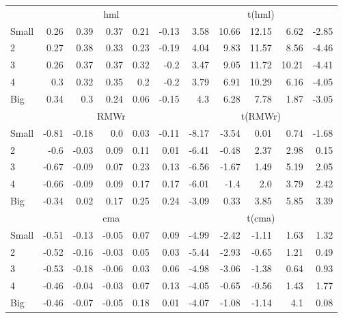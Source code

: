 \begin{table}[!ht]
\begin{tabular}{lrrrrrrrrrr}
  

      & \multicolumn{5}{c}{hml} & \multicolumn{5}{c}{t(hml)} \\
    \cmidrule(r){2-6} \cmidrule(r){7-11}
      Small  & 0.26  & 0.39  & 0.37  & 0.21  & -0.13   & 3.58  & 10.66  & 12.15  & 6.62  & -2.85  \\
          2  & 0.27  & 0.38  & 0.33  & 0.23  & -0.19   & 4.04  & 9.83  & 11.57  & 8.56  & -4.46  \\
          3  & 0.26  & 0.37  & 0.37  & 0.32  & -0.2   & 3.47  & 9.05  & 11.72  & 10.21  & -4.41  \\
          4  & 0.3  & 0.32  & 0.35  & 0.2  & -0.2   & 3.79  & 6.91  & 10.29  & 6.16  & -4.05  \\
      Big    & 0.34  & 0.3  & 0.24  & 0.06  & -0.15   & 4.3  & 6.28  & 7.78  & 1.87  & -3.05  \\

  

      & \multicolumn{5}{c}{RMWr} & \multicolumn{5}{c}{t(RMWr)} \\
    \cmidrule(r){2-6} \cmidrule(r){7-11}
      Small  & -0.81  & -0.18  & 0.0  & 0.03  & -0.11   & -8.17  & -3.54  & 0.01  & 0.74  & -1.68  \\
          2  & -0.6  & -0.03  & 0.09  & 0.11  & 0.01   & -6.41  & -0.48  & 2.37  & 2.98  & 0.15  \\
          3  & -0.67  & -0.09  & 0.07  & 0.23  & 0.13   & -6.56  & -1.67  & 1.49  & 5.19  & 2.05  \\
          4  & -0.66  & -0.09  & 0.09  & 0.17  & 0.17   & -6.01  & -1.4  & 2.0  & 3.79  & 2.42  \\
      Big    & -0.34  & 0.02  & 0.17  & 0.25  & 0.24   & -3.09  & 0.33  & 3.85  & 5.85  & 3.39  \\

  

      & \multicolumn{5}{c}{cma} & \multicolumn{5}{c}{t(cma)} \\
    \cmidrule(r){2-6} \cmidrule(r){7-11}
      Small  & -0.51  & -0.13  & -0.05  & 0.07  & 0.09   & -4.99  & -2.42  & -1.11  & 1.63  & 1.32  \\
          2  & -0.52  & -0.16  & -0.03  & 0.05  & 0.03   & -5.44  & -2.93  & -0.65  & 1.21  & 0.49  \\
          3  & -0.53  & -0.18  & -0.06  & 0.03  & 0.06   & -4.98  & -3.06  & -1.38  & 0.64  & 0.93  \\
          4  & -0.46  & -0.04  & -0.03  & 0.07  & 0.13   & -4.05  & -0.65  & -0.56  & 1.43  & 1.77  \\
      Big    & -0.46  & -0.07  & -0.05  & 0.18  & 0.01   & -4.07  & -1.08  & -1.14  & 4.1  & 0.08  \\

  

  \bottomrule
\end{tabular}
\label{tbl:25_Size_Mom_FF2016a}
\end{table}